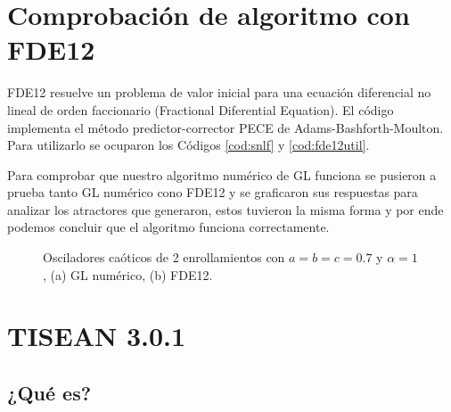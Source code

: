 \documentclass[10pt,a4paper]{article}
\begin{document}
\section{Comprobación de algoritmo con FDE12}

FDE12 resuelve un problema de valor inicial para una ecuación diferencial no lineal de orden faccionario (Fractional Diferential Equation). El código implementa el método predictor-corrector PECE de Adams-Bashforth-Moulton. Para utilizarlo se ocuparon los Códigos \ref{cod:snlf} y \ref{cod:fde12util}.

Para comprobar que nuestro algoritmo numérico de GL funciona se pusieron a prueba tanto GL numérico cono FDE12 y se graficaron sus respuestas para analizar los atractores que generaron, estos tuvieron la misma forma y por ende podemos concluir que el algoritmo funciona correctamente.


\begin{figure}[htp]
	\centering
	\hspace{2cm}
	\caption{Osciladores caóticos de 2 enrollamientos con $a =b = c = 0.7$ y $\alpha = 1$, (a) GL numérico, (b) FDE12.}
	\label{fig:glvsfde12}
\end{figure}


\section{TISEAN 3.0.1}

\subsection{¿Qué es?}
\end{document}
